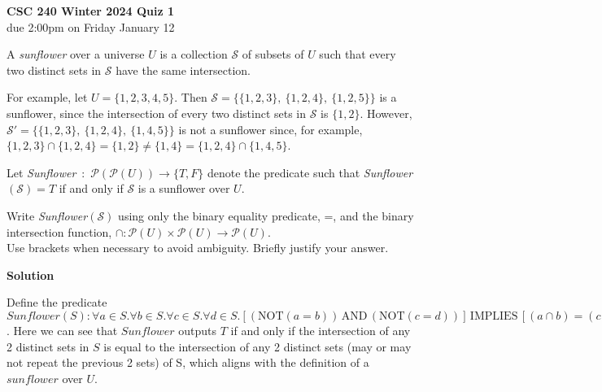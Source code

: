 \documentclass[12pt]{article}
\newcommand{\nnot}{\mathrm{NOT}}
\newcommand{\aand}{\,\mathrm{AND}\,}
\newcommand{\iimplies}{\,\mathrm{IMPLIES}\,}
\begin{document}
\begin{center}
{\bf CSC 240 Winter 2024 Quiz 1}\\
due 2:00pm on Friday January 12 
\end{center}

\medskip

A {\em sunflower} over a universe $U$ is a collection $\mathcal{S}$ of subsets of $U$ such that every two distinct sets in $\mathcal{S}$ have the same intersection. 

For example, let $U = \{1,2,3,4,5\}$. Then $\mathcal{S} = \{ \{1,2,3\},\ \{1,2,4\},\ \{1,2,5\} \}$ is a sunflower, since the intersection of every two distinct sets in $\mathcal{S}$ is $\{1,2\}$.
However, $\mathcal{S}' = \{ \{1,2,3\},\ \{1,2,4\},\ \{1,4,5\} \}$ is not a sunflower since, for example, 
$\{1,2,3\} \cap \{1,2,4\} = \{1,2\} \neq \{1,4\} = \{1,2,4\} \cap \{1,4,5\}$.
 

Let {\it Sunflower}\ :\ $ \mathcal{P}(\mathcal{P}(U)) \to \{T,F\}$ denote the predicate such that {\it Sunflower}$(\mathcal{S}) = T$ if and only if $\mathcal{S}$ is a sunflower over $U$. 

Write {\it Sunflower}$(\mathcal{S})$ using only the binary equality predicate, =, and
the binary intersection function, $\cap:\mathcal{P}(U)\times \mathcal{P}(U)\rightarrow \mathcal{P}(U)$.\\
Use brackets when necessary to avoid ambiguity. 
Briefly justify your answer. 

\vspace{.25in}\textbf{Solution}\vspace{.10in}

Define the predicate $Sunflower(S):\forall a\in S.\forall b\in S. \forall c\in S.\forall d\in S. [(\nnot(a=b))\aand(\nnot(c=d))]\iimplies[(a\cap b)=(c\cap d)]$. Here we can see that $Sunflower$ outputs $T$ if and only if the intersection of any 2 distinct sets in $S$ is equal to the intersection of any 2 distinct sets (may or may not repeat the previous 2 sets) of S, which aligns with the definition of a $sunflower$ over $U$. 
\end{document}
